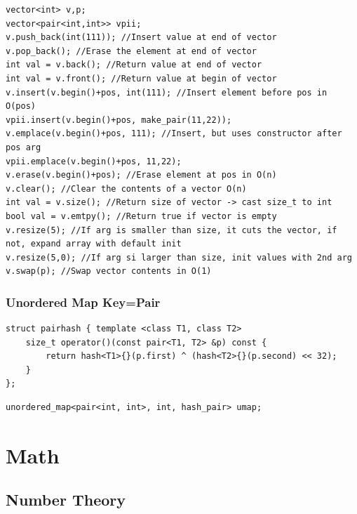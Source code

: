 \documentclass[twoside]{article}
\begin{document}
\begin{multicols*}{2}
\begin{verbatim}
vector<int> v,p;
vector<pair<int,int>> vpii;
v.push_back(int(111)); //Insert value at end of vector
v.pop_back(); //Erase the element at end of vector
int val = v.back(); //Return value at end of vector
int val = v.front(); //Return value at begin of vector
v.insert(v.begin()+pos, int(111); //Insert element before pos in O(pos)
vpii.insert(v.begin()+pos, make_pair(11,22));
v.emplace(v.begin()+pos, 111); //Insert, but uses constructor after pos arg
vpii.emplace(v.begin()+pos, 11,22);
v.erase(v.begin()+pos); //Erase element at pos in O(n)
v.clear(); //Clear the contents of a vector O(n)
int val = v.size(); //Return size of vector -> cast size_t to int
bool val = v.emtpy(); //Return true if vector is empty
v.resize(5); //If arg is smaller than size, it cuts the vector, if not, expand array with default init
v.resize(5,0); //If arg si larger than size, init values with 2nd arg
v.swap(p); //Swap vector contents in O(1)

\end{verbatim}

\subsubsectionfont{\large\bfseries\sffamily\underline}
\subsubsection*{Unordered Map Key=Pair}
\begin{verbatim}
struct pairhash { template <class T1, class T2>
	size_t operator()(const pair<T1, T2> &p) const {
		return hash<T1>{}(p.first) ^ (hash<T2>{}(p.second) << 32);
	}
};
\end{verbatim}
\vspace{-12pt}
\begin{verbatim}
unordered_map<pair<int, int>, int, hash_pair> umap;

\end{verbatim}

\sectionfont{\bfseries\sffamily\centering\Huge}
\vspace{1em}
\section*{Math}
\vspace{3em}
\subsectionfont{\bfseries\sffamily\centering\LARGE}
\vspace{0em}
\subsection*{Number Theory}
\vspace{2em}
\subsubsectionfont{\large\bfseries\sffamily\underline}

\end{multicols*}
\end{document}

